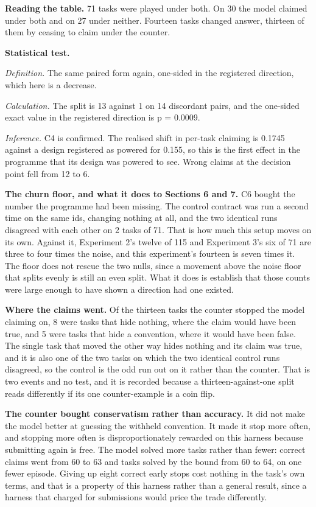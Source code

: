 \documentclass[11pt]{article}
\begin{document}
\textbf{Reading the table.} 71 tasks were played under both. On 30 the model claimed under both and on 27 under neither. Fourteen tasks changed answer, thirteen of them by ceasing to claim under the counter.

\textbf{Statistical test.}

\emph{Definition.} The same paired form again, one-sided in the registered direction, which here is a decrease.

\emph{Calculation.} The split is 13 against 1 on 14 discordant pairs, and the one-sided exact value in the registered direction is p = 0.0009.

\emph{Inference.} C4 is confirmed. The realised shift in per-task claiming is 0.1745 against a design registered as powered for 0.155, so this is the first effect in the programme that its design was powered to see. Wrong claims at the decision point fell from 12 to 6.

\textbf{The churn floor, and what it does to Sections 6 and 7.} C6 bought the number the programme had been missing. The control contract was run a second time on the same ids, changing nothing at all, and the two identical runs disagreed with each other on 2 tasks of 71. That is how much this setup moves on its own. Against it, Experiment 2's twelve of 115 and Experiment 3's six of 71 are three to four times the noise, and this experiment's fourteen is seven times it. The floor does not rescue the two nulls, since a movement above the noise floor that splits evenly is still an even split. What it does is establish that those counts were large enough to have shown a direction had one existed.

\textbf{Where the claims went.} Of the thirteen tasks the counter stopped the model claiming on, 8 were tasks that hide nothing, where the claim would have been true, and 5 were tasks that hide a convention, where it would have been false. The single task that moved the other way hides nothing and its claim was true, and it is also one of the two tasks on which the two identical control runs disagreed, so the control is the odd run out on it rather than the counter. That is two events and no test, and it is recorded because a thirteen-against-one split reads differently if its one counter-example is a coin flip.

\textbf{The counter bought conservatism rather than accuracy.} It did not make the model better at guessing the withheld convention. It made it stop more often, and stopping more often is disproportionately rewarded on this harness because submitting again is free. The model solved more tasks rather than fewer: correct claims went from 60 to 63 and tasks solved by the bound from 60 to 64, on one fewer episode. Giving up eight correct early stops cost nothing in the task's own terms, and that is a property of this harness rather than a general result, since a harness that charged for submissions would price the trade differently.
\end{document}
